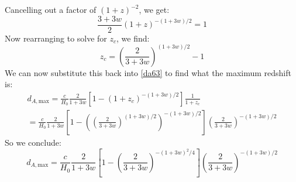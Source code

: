 Cancelling out a factor of $(1+z)^{-2}$, we get:
\begin{equation}
    \frac{3+3w}{2}(1+z)^{-(1+3w)/2} = 1
\end{equation}
Now rearranging to solve for $z_c$, we find:
\begin{equation}
    \boxed{z_c = \left(\frac{2}{3+3w}\right)^{(1+3w)/2} - 1}
\end{equation}
We can now substitute this back into \eqref{da63} to find what the maximum redshift is:
\begin{multline}
    d_{A, \text{max}} =  \frac{c}{H_0}\frac{2}{1+3w}\left[1 - (1+z_c)^{-(1+3w)/2}\right]\frac{1}{1+z_c}
    \\ = \frac{c}{H_0}\frac{2}{1+3w}\left[1 - \left(\left(\frac{2}{3+3w}\right)^{(1+3w)/2}\right)^{-(1+3w)/2}\right]\left(\frac{2}{3+3w}\right)^{-(1+3w)/2}
\end{multline}
So we conclude:
\begin{equation}
    \boxed{d_{A, \text{max}} = \frac{c}{H_0}\frac{2}{1+3w}\left[1 - \left(\frac{2}{3+3w}\right)^{-(1+3w)^2/4}\right]\left(\frac{2}{3+3w}\right)^{-(1+3w)/2}}
\end{equation}

